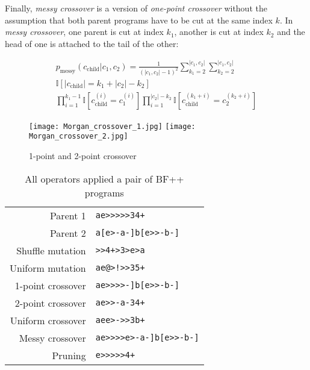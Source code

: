 Finally, \emph{messy crossover} is a version of \emph{one-point crossover} without the assumption that both parent programs have to be cut at the same index $k$.
In \emph{messy crossover}, one parent is cut at index $k_1$, another is cut at index $k_2$ and the head of one is attached to the tail of the other:

\begin{multline}
    p_\text{messy}(c_\text{child}|c_1,c_2) =
        \frac{1}{(|c_1,c_2|-1)^2}
        \sum\limits_{k_1=2}^{|c_1,c_2|} \sum\limits_{k_2=2}^{|c_1,c_2|} \\ \mathbb{I}[|c_\text{child}|=k_1+|c_2|-k_2] \\ \prod\limits_{i=1}^{k_1-1} \mathbb{I}[c_\text{child}^{(i)} = c_1^{(i)}] \prod\limits_{i=1}^{|c_2|-k_2} \mathbb{I}[c_\text{child}^{(k_1+i)} = c_2^{(k_2+i)}]
\end{multline}

\begin{figure}
    \centering
    \texttt{[image: Morgan\_crossover\_1.jpg]}
    \texttt{[image: Morgan\_crossover\_2.jpg]}
    \caption{1-point and 2-point crossover \cite{evocritique}}
    \label{fig:crossover}
\end{figure}

\begin{table}
    \centering
    \begin{tabular}{r|l}
         Parent 1 & \color{blue}\verb|ae>>>>>34+| \\
         Parent 2 & \color{red}\verb|a[e>-a-]b[e>>-b-]| \\
         \midrule
         Shuffle mutation & \color{blue}\verb|>>4+>3>e>a| \\
         Uniform mutation & \color{blue}\verb|ae|\color{black}\verb|@|\color{blue}\verb|>|\color{black}\verb|!|\color{blue}\verb|>>3|\color{black}\verb|5|\color{blue}\verb|+| \\
         1-point crossover & \color{blue}\verb|ae>>>>|\color{red}\verb|-]b[e>>-b-]| \\
         2-point crossover & \color{blue}\verb|ae>|\color{red}\verb|>-a-|\color{blue}\verb|34+| \\
         Uniform crossover & \color{blue}\verb|ae|\color{red}\verb|e|\color{blue}\verb|>|\color{red}\verb|-|\color{blue}\verb|>>3|\color{red}\verb|b|\color{blue}\verb|+| \\
         Messy crossover & \color{blue}\verb|ae>>>>|\color{red}\verb|e>-a-]b[e>>-b-]| \\
         Pruning & \color{blue}\verb|e>>>>>4+| \\
    \end{tabular}
    \caption{All operators applied a pair of BF++ \cite{bf++} programs}
\end{table}


